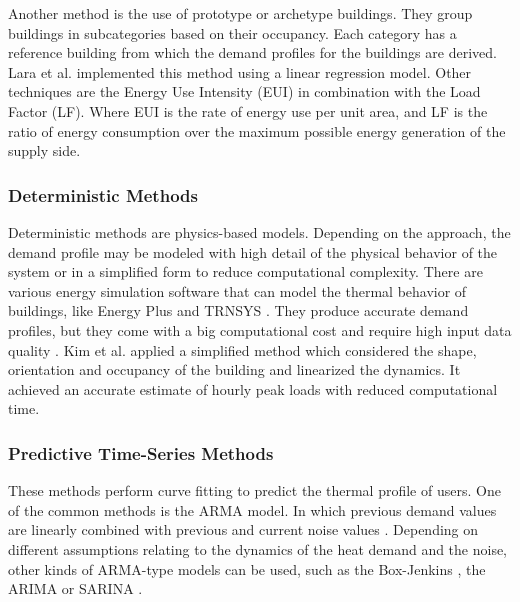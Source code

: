 Another method is the use of prototype or archetype buildings. They group buildings in subcategories based on their occupancy. Each category has a reference building from which the demand profiles for the buildings are derived. Lara et al. \cite{ARAMBULALARA2015160} implemented this method using a linear regression model. Other techniques are the Energy Use Intensity (EUI) \cite{sharp1996energy} in combination with the Load Factor (LF)\cite{DALLAROSA20116890}. Where EUI is the rate of energy use per unit area, and LF is the ratio of energy consumption over the maximum possible energy generation of the supply side.


\subsubsection{Deterministic Methods}
Deterministic methods are physics-based models. Depending on the approach, the demand profile may be modeled with high detail of the physical behavior of the system or in a simplified form to reduce computational complexity. There are various energy simulation software that can model the thermal behavior of buildings, like Energy Plus \cite{EnergyPlus} and TRNSYS \cite{trnsys1975}. They produce accurate demand profiles, but they come with a big computational cost and require high input data quality \cite{GUADALFAJARA20141096}. Kim et al. \cite{KIM} applied a simplified method which considered the shape, orientation and occupancy of the building and linearized the dynamics. It achieved an accurate estimate of hourly peak loads with reduced computational time.
 
\subsubsection{Predictive Time-Series Methods}
These methods perform curve fitting to predict the thermal profile of users. One of the common methods is the ARMA model. In which previous demand values are linearly combined with previous and current noise values \cite{GRossGaliana}. Depending on different assumptions relating to the dynamics of the heat demand and the noise, other kinds of ARMA-type models can be used, such as the Box-Jenkins \cite{BoxJenkins}, the ARIMA \cite{ARINA} or SARINA \cite{SARINA}.


